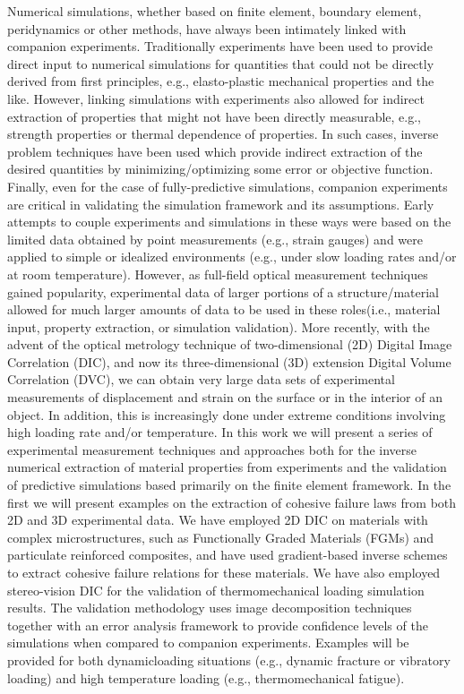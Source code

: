 Numerical simulations, whether based on finite element, boundary element, peridynamics or other methods, have always been intimately linked with companion experiments. Traditionally experiments have been used to provide direct input to numerical simulations for quantities that could not be directly derived from first principles, e.g., elasto-plastic mechanical properties and the like. However, linking simulations with experiments also allowed for indirect extraction of properties that might not have been directly measurable, e.g., strength properties or thermal dependence of properties. In such cases, inverse problem techniques have been used which provide indirect extraction of the desired quantities by minimizing/optimizing some error or objective function. Finally, even for the case of fully-predictive simulations, companion experiments are critical in validating the simulation framework and its assumptions. Early attempts to couple experiments and simulations in these ways were based on the limited data obtained by point measurements (e.g., strain gauges) and were applied to simple or idealized environments (e.g., under slow loading rates and/or at room temperature). However, as full-field optical measurement techniques gained popularity, experimental data of larger portions of a structure/material allowed for much larger amounts of data to be used in these roles(i.e., material input, property extraction, or simulation validation). More recently, with the advent of the optical metrology technique of two-dimensional (2D) Digital Image Correlation (DIC), and now its three-dimensional (3D) extension Digital Volume Correlation (DVC), we can obtain very large data sets of experimental measurements of displacement and strain on the surface or in the interior of an object. In addition, this is increasingly done under extreme conditions involving high loading rate and/or temperature. In this work we will present a series of experimental measurement techniques and approaches both for the inverse numerical extraction of material properties from experiments and the validation of predictive simulations based primarily on the finite element framework. In the first we will present examples on the extraction of cohesive failure laws from both 2D and 3D experimental data. We have employed 2D DIC on materials with complex microstructures, such as Functionally Graded Materials (FGMs) and particulate reinforced composites, and have used gradient-based inverse schemes to extract cohesive failure relations for these materials. We have also employed stereo-vision DIC for the validation of thermomechanical loading simulation results. The validation methodology uses image decomposition techniques together with an error analysis framework to provide confidence levels of the simulations when compared to companion experiments.  Examples will be provided for both dynamicloading situations (e.g., dynamic fracture or vibratory loading) and high temperature loading (e.g., thermomechanical fatigue).
